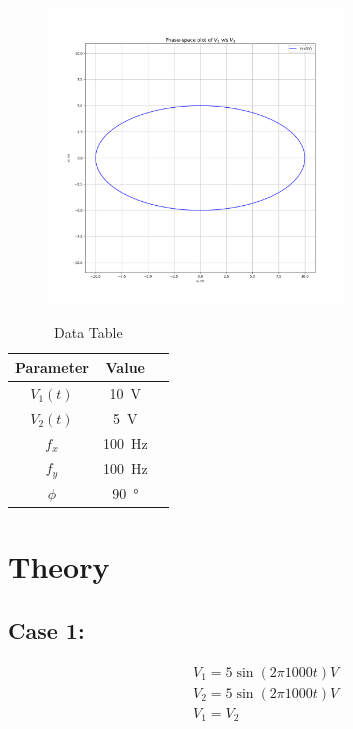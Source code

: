 \documentclass[a4paper,12pt]{article}
\begin{document}
\begin{figure}[htbp]
\begin{center}
    \includegraphics[width=0.7\textwidth]{figs/6/pplot.png}
\end{center}
\end{figure}


\begin{table}[htbp]
    \centering
    \begin{tabular}{|c|c|c|}
        \hline
        \textbf{Parameter} & \textbf{Value} \\
        \hline
        $V_1(t)$ & \SI{10}{\volt} \\
        $V_2(t)$ & \SI{5}{\volt} \\
        $f_x$ & \SI{100}{\hertz} \\
        $f_y$ & \SI{100}{\hertz} \\
        $\phi$ & \SI{90}{\degree} \\
        \hline
    \end{tabular}
    \caption{Data Table}
    \label{tab:sample}
\end{table}





\section{Theory}

\subsection{Case 1:}
\begin{align*}
    &V_1=5\sin(2\pi 1000t)V\\
    &V_2=5\sin(2\pi 1000t)V\\
    &V_1=V_2
\end{align*}
\end{document}
